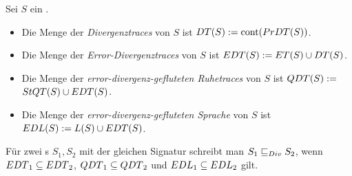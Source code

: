 \begin{Def}
\label{DefRuheDivSemantik}
  Sei $S$ ein \EIO{}.
  \begin{itemize}
    \item Die Menge der \emph{Divergenztraces} von $S$ ist $DT{}(S) :=
      \mathrm{cont}{}(PrDT{}(S))$.
    \item Die Menge der \emph{Error-Divergenztraces} von $S$ ist $EDT{}(S) :=
      ET{}(S)\cup DT{}(S)$.
    \item Die Menge der \emph{error-divergenz-gefluteten Ruhetraces} von $S$
      ist $QDT{}(S) :=$\linebreak $StQT{}(S)\cup EDT{}(S)$.
    \item Die Menge der \emph{error-divergenz-gefluteten Sprache} von $S$ ist
      $EDL{}(S) := L(S) \cup EDT{}(S)$.
  \end{itemize}
  Für zwei \EIO{}s $S_1, S_2$ mit der gleichen Signatur schreibt man $S_1\sqsubseteq _{Div}
  S_2$, wenn $EDT{}_1\subseteq EDT{}_2$, $QDT{}_1\subseteq QDT{}_2$ und
  $EDL{}_1\subseteq EDL{}_2$ gilt.
\end{Def}

